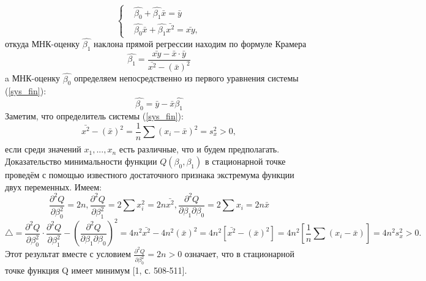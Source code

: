 		\begin{equation}
	   \begin{cases}
         & \hat{\beta_{0}} + \hat{\beta_{1}}\bar{x} = 
         \bar{y}\\ 
        & \hat{\beta_{0}}\bar{x} + \hat{\beta_{1}}\bar{x^{2}} = \bar{xy},
       \end{cases}
       \label{sys_fin}
	\end{equation}
	откуда МНК-оценку $\hat{\beta_1}$ наклона прямой регрессии находим по формуле Крамера
	\begin{equation}
	    \hat{\beta_{1}} = \frac{\bar{xy} - \bar{x} \cdot \bar{y}}{\bar{x^{2}} - (\bar{x})^{2}}
	    \label{beta_1_new}
	\end{equation}
	a МНК-оценку $\hat{\beta_0}$  определяем непосредственно из первого уравнения системы (\ref{sys_fin}):
	\begin{equation}
	    \hat{\beta_{0}} = \bar{y} - \bar{x}\hat{\beta_{1}}
	    \label{beta_0_new}
	\end{equation}
	Заметим, что определитель системы (\ref{sys_fin}):
	\begin{equation}
	    \bar{x^{2}} - (\bar{x})^{2} = \frac{1}{n}\sum_{}{}{(x_{i} - \bar{x})^{2}} = s_{x}^{2} > 0, 
	\end{equation}
	если среди значений $x_{1},...,x_{n}$ есть различные, что и будем предполагать.
	\newline
	Доказательство минимальности функции $Q(\beta_{0}, \beta_{1})$ в стационарной точке проведём с помощью известного достаточного признака экстремума функции двух переменных. Имеем:
	\begin{equation}
	    \frac{\partial ^{2} Q}{\partial \beta_{0}^{2}} = 2n, 
        \frac{\partial ^{2} Q}{\partial \beta_{1}^{2}} = 2\sum_{}{}{x_{i}^{2}} = 2n\bar{x^{2}}, 
        \frac{\partial ^{2} Q}{\partial \beta_{1} \partial \beta_{0}} = 2\sum_{}{}{x_{i}} = 2n\bar{x}
        \label{frac_eq}
	\end{equation}
	\begin{equation}
	    \bigtriangleup = \frac{\partial^{2}Q}{\partial \beta_{0}^{2}} \cdot \frac{\partial^{2}Q}{\partial \beta_{1}^{2}} - (\frac{\partial^{2}Q}{\partial \beta_{1} \partial \beta_{0}})^{2} = 
	    4n^{2}\bar{x^{2}} - 4n^2(\bar{x})^{2} = 
	    4n^{2}\left[\bar{x^{2}} - (\bar{x})^{2}\right] = 4n^{2}\left[ \frac{1}{n}\sum{}_{}{(x_{i} - \bar{x})}\right] = 4n^{2}s_{x}^{2} > 0.
	    \label{det_sys}
	\end{equation}
	Этот результат вместе с условием $\frac{\partial^{2}Q}{\partial \beta_{0}^{2}} = 2n > 0$ означает, что в стационарной точке функция Q имеет минимум [1, с. 508-511].




